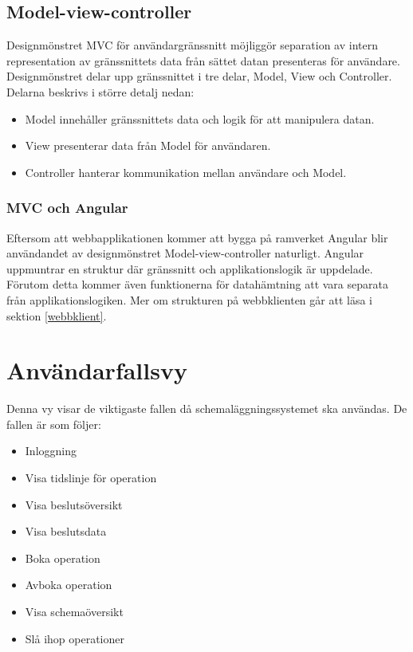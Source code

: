 \documentclass[a4paper,10pt]{article}
\begin{document}
\subsection{Model-view-controller}
Designmönstret MVC för användargränssnitt möjliggör separation av intern representation av gränssnittets data från sättet datan presenteras för användare. Designmönstret delar upp gränssnittet i tre delar, Model, View och Controller. Delarna beskrivs i större detalj nedan:
\begin{itemize}
  \item Model innehåller gränssnittets data och logik för att manipulera datan.
  \item View presenterar data från Model för användaren.
  \item Controller hanterar kommunikation mellan användare och Model.
\end{itemize}

\subsubsection{MVC och Angular}

Eftersom att webbapplikationen kommer att bygga på ramverket Angular blir användandet av designmönstret Model-view-controller naturligt. Angular uppmuntrar en struktur där gränssnitt och applikationslogik är uppdelade. Förutom detta kommer även funktionerna för datahämtning att vara separata från applikationslogiken. Mer om strukturen på webbklienten går att läsa i sektion \ref{webbklient}.

\section{Användarfallsvy}

Denna vy visar de viktigaste fallen då schemaläggningssystemet ska användas. De fallen är som följer:
\begin{itemize}
	\item Inloggning
	\item Visa tidslinje för operation
	\item Visa beslutsöversikt
	\item Visa beslutsdata
	\item Boka operation
	\item Avboka operation
	\item Visa schemaöversikt
	\item Slå ihop operationer
\end{itemize}
\end{document}
